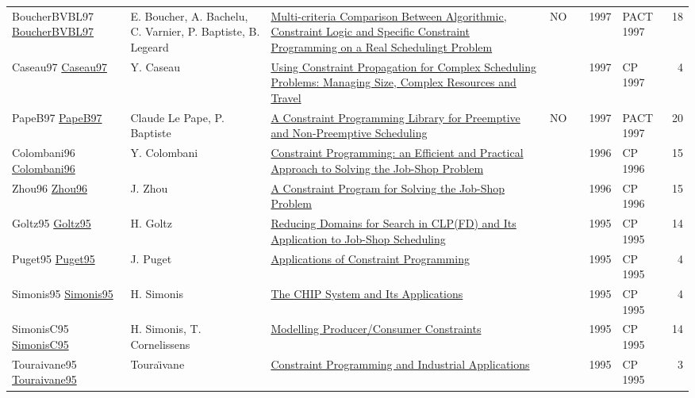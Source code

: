 {\begin{longtable}{p{3cm}p{6cm}p{7cm}rrrp{3cm}r}
BoucherBVBL97 \href{}{BoucherBVBL97} & E. Boucher, A. Bachelu, C. Varnier, P. Baptiste, B. Legeard & \href{papers/BoucherBVBL97.pdf}{Multi-criteria Comparison Between Algorithmic, Constraint Logic and Specific Constraint Programming on a Real Schedulingt Problem} & NO & \cite{BoucherBVBL97} & 1997 & PACT 1997 & 18\\
Caseau97 \href{https://doi.org/10.1007/BFb0017437}{Caseau97} & Y. Caseau & \href{papers/Caseau97.pdf}{Using Constraint Propagation for Complex Scheduling Problems: Managing Size, Complex Resources and Travel} &  & \cite{Caseau97} & 1997 & CP 1997 & 4\\
PapeB97 \href{}{PapeB97} & Claude Le Pape, P. Baptiste & \href{papers/PapeB97.pdf}{A Constraint Programming Library for Preemptive and Non-Preemptive Scheduling} & NO & \cite{PapeB97} & 1997 & PACT 1997 & 20\\
Colombani96 \href{https://doi.org/10.1007/3-540-61551-2\_72}{Colombani96} & Y. Colombani & \href{papers/Colombani96.pdf}{Constraint Programming: an Efficient and Practical Approach to Solving the Job-Shop Problem} &  & \cite{Colombani96} & 1996 & CP 1996 & 15\\
Zhou96 \href{https://doi.org/10.1007/3-540-61551-2\_97}{Zhou96} & J. Zhou & \href{papers/Zhou96.pdf}{A Constraint Program for Solving the Job-Shop Problem} &  & \cite{Zhou96} & 1996 & CP 1996 & 15\\
Goltz95 \href{https://doi.org/10.1007/3-540-60299-2\_33}{Goltz95} & H. Goltz & \href{papers/Goltz95.pdf}{Reducing Domains for Search in {CLP(FD)} and Its Application to Job-Shop Scheduling} &  & \cite{Goltz95} & 1995 & CP 1995 & 14\\
Puget95 \href{https://doi.org/10.1007/3-540-60299-2\_43}{Puget95} & J. Puget & \href{papers/Puget95.pdf}{Applications of Constraint Programming} &  & \cite{Puget95} & 1995 & CP 1995 & 4\\
Simonis95 \href{https://doi.org/10.1007/3-540-60299-2\_42}{Simonis95} & H. Simonis & \href{papers/Simonis95.pdf}{The {CHIP} System and Its Applications} &  & \cite{Simonis95} & 1995 & CP 1995 & 4\\
SimonisC95 \href{https://doi.org/10.1007/3-540-60299-2\_27}{SimonisC95} & H. Simonis, T. Cornelissens & \href{papers/SimonisC95.pdf}{Modelling Producer/Consumer Constraints} &  & \cite{SimonisC95} & 1995 & CP 1995 & 14\\
Touraivane95 \href{https://doi.org/10.1007/3-540-60299-2\_41}{Touraivane95} & Toura{\"{\i}}vane & \href{papers/Touraivane95.pdf}{Constraint Programming and Industrial Applications} &  & \cite{Touraivane95} & 1995 & CP 1995 & 3\\

\end{longtable}}
